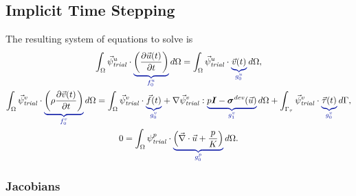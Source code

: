 \subsection{Implicit Time Stepping}
The resulting system of equations to solve  is
\begin{gather}
  \label{eqn:imcompressible:elasticity:velocity}
  \int_\Omega \trialvec[u] \cdot \eqnannotate{\left( \frac{\partial \vec{u}(t)}{\partial t} 
\right)}{f_0^u} \, 
d\Omega = 
  \int_\Omega \trialvec[u] \cdot \eqnannotate{\vec{v}(t)}{g_0^u} \, d\Omega, \\
%
  \label{eqn:incompressible:elasticity:displacement:implicit}
  \int_\Omega \trialvec[v] \cdot \eqnannotate{\left( \rho \frac{\partial \vec{v}(t)}{\partial 
t} \right)}{f_0^v} 
\, d\Omega =
  \int_\Omega \trialvec[v] \cdot \eqnannotate{\vec{f}(t)}{g_0^v} + \nabla \trialvec[v] : 
\eqnannotate{p\tensor{I}-
\tensor{\sigma}^\mathit{dev}(\vec{u})}{g_1^v} \, d\Omega + \int_{\Gamma_\tau} \trialvec[v] 
\cdot 
\eqnannotate{\vec{\tau}(t)}{g_0^v} \, d\Gamma, \\
%
  \label{eqn:incompressible:elasticity:pressure:implicit}
  0 = \int_\Omega \trialscalar[p] \cdot \eqnannotate{\left(\vec{\nabla} \cdot \vec{u} + 
\frac{p}{K} \right)}
{g_0^p} \, d\Omega.
\end{gather}


\subsubsection{Jacobians}

